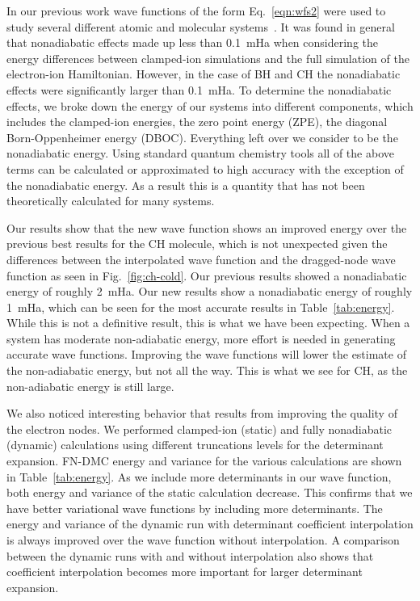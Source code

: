 \documentclass[aip,jcp,numerical,reprint]{revtex4-1}
\begin{document}
In our previous work wave functions of the form Eq.~\eqref{eqn:wfs2} were used to study several different atomic and molecular systems~\cite{Yang2015}.  It was found in general that nonadiabatic effects made up less than 0.1~mHa when considering the energy differences between clamped-ion simulations and the full simulation of the electron-ion Hamiltonian.   However, in the case of BH and CH the nonadiabatic effects were  significantly larger than 0.1~mHa.  To determine the nonadiabatic effects, we broke down the energy of our systems into different components, which includes the clamped-ion energies, the zero point energy (ZPE), the diagonal Born-Oppenheimer energy (DBOC).   Everything left over we consider to be the nonadiabatic energy.   Using standard quantum chemistry tools all of the above terms can be calculated or approximated to high accuracy with the exception of the nonadiabatic energy.  As a result this is a quantity that has not been theoretically calculated for many systems.  %

 Our results show that  the new wave function shows an improved energy over the previous best results for the CH molecule, which is not unexpected given the differences between the interpolated wave function and the dragged-node wave function as seen in Fig.~\ref{fig:ch-cold}. Our previous results showed a nonadiabatic energy of roughly 2~mHa. Our new results show a nonadiabatic energy of roughly 1~mHa, which can be seen for the most accurate results in Table~\ref{tab:energy}.  While this is  not a definitive result, this is what we have been expecting.  When a system has moderate non-adiabatic energy, more effort is needed in generating accurate wave functions.  Improving the wave functions will lower the estimate of the non-adiabatic energy, but not all the way.  This is what we see for CH, as the non-adiabatic energy is still large.

We also noticed interesting behavior that results from improving the quality of the electron nodes.  We performed clamped-ion (static) and fully nonadiabatic (dynamic) calculations using different truncations levels for the determinant expansion. FN-DMC energy and variance for the various calculations are shown in Table~\ref{tab:energy}. As we include more determinants in our wave function, both energy and variance of the static calculation decrease. This confirms that we have better variational wave functions by including more determinants. The energy and variance of the dynamic run with determinant coefficient interpolation is always improved  over the wave function without interpolation.  A comparison between the dynamic runs with and without interpolation also shows that coefficient interpolation becomes more important for larger determinant expansion.
\end{document}
